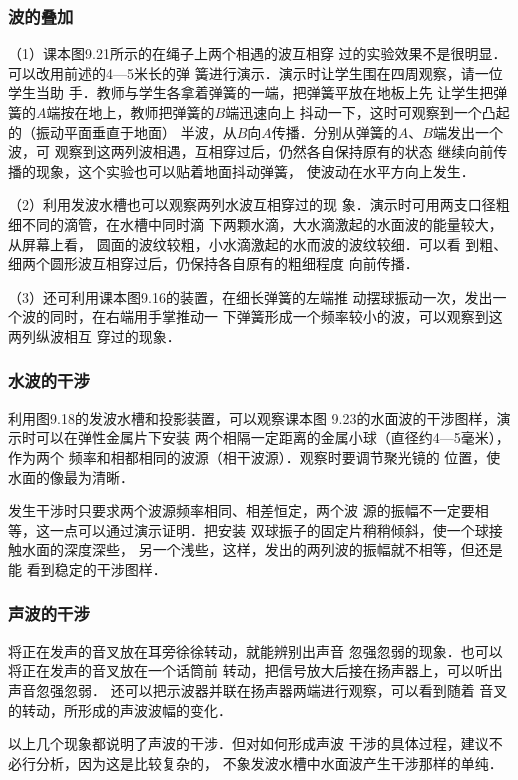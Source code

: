 \subsubsection{波的叠加}
（1）课本图9.21所示的在绳子上两个相遇的波互相穿
过的实验效果不是很明显．可以改用前述的4—5米长的弹
簧进行演示．演示时让学生围在四周观察，请一位学生当助
手．教师与学生各拿着弹簧的一端，把弹簧平放在地板上先
让学生把弹簧的$A$端按在地上，教师把弹簧的$B$端迅速向上
抖动一下，这时可观察到一个凸起的（振动平面垂直于地面）
半波，从$B$向$A$传播．分别从弹簧的$A$、$B$端发出一个波，可
观察到这两列波相遇，互相穿过后，仍然各自保持原有的状态
继续向前传播的现象，这个实验也可以贴着地面抖动弹簧，
使波动在水平方向上发生．

（2）利用发波水槽也可以观察两列水波互相穿过的现
象．演示时可用两支口径粗细不同的滴管，在水槽中同时滴
下两颗水滴，大水滴激起的水面波的能量较大，从屏幕上看，
圆面的波纹较粗，小水滴激起的水而波的波纹较细．可以看
到粗、细两个圆形波互相穿过后，仍保持各自原有的粗细程度
向前传播．

（3）还可利用课本图9.16的装置，在细长弹簧的左端推
动摆球振动一次，发出一个波的同时，在右端用手掌推动一
下弹簧形成一个频率较小的波，可以观察到这两列纵波相互
穿过的现象．

\subsubsection{水波的干涉}
利用图9.18的发波水槽和投影装置，可以观察课本图
9.23的水面波的干涉图样，演示时可以在弹性金属片下安装
两个相隔一定距离的金属小球（直径约4—5毫米），作为两个
频率和相都相同的波源（相干波源）．观察时要调节聚光镜的
位置，使水面的像最为清晰．

发生干涉时只要求两个波源频率相同、相差恒定，两个波
源的振幅不一定要相等，这一点可以通过演示证明．把安装
双球振子的固定片稍稍倾斜，使一个球接触水面的深度深些，
另一个浅些，这样，发出的两列波的振幅就不相等，但还是能
看到稳定的干涉图样．

\subsubsection{声波的干涉}
将正在发声的音叉放在耳旁徐徐转动，就能辨别出声音
忽强忽弱的现象．也可以将正在发声的音叉放在一个话筒前
转动，把信号放大后接在扬声器上，可以听出声音忽强忽弱．
还可以把示波器并联在扬声器两端进行观察，可以看到随着
音叉的转动，所形成的声波波幅的变化．

以上几个现象都说明了声波的干涉．但对如何形成声波
干涉的具体过程，建议不必行分析，因为这是比较复杂的，
不象发波水槽中水面波产生干涉那样的单纯．

